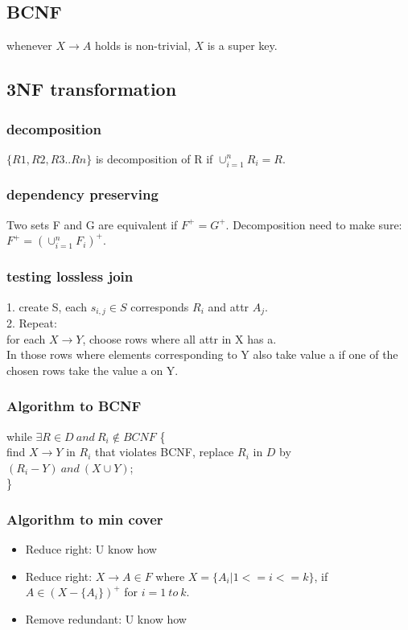 \documentclass[a4paper]{scrartcl}
\newcommand{\set}[2]{\{#1|#2\}}
\begin{document}
  \subsection{BCNF}
    whenever $X \rightarrow A$ holds is non-trivial, $X$ is a super key.
  \subsection{3NF transformation}
    \subsubsection{decomposition}
      $\{R1, R2, R3 .. Rn\}$ is decomposition of R if $\cup^{n}_{i=1}R_i = R$.
    \subsubsection{dependency preserving}
      Two sets F and G are equivalent if $F^+ = G^+$. Decomposition need to make sure: $F^+ = (\cup^n_{i=1}F_i)^+$.
    \subsubsection{testing lossless join}
      1. create S, each $s_{i,j} \in S$ corresponds $R_i$ and attr $A_j$.\\
      2. Repeat:\\
        for each $X \rightarrow Y$, choose rows where all attr in X has a.\\
        In those rows where elements corresponding to Y also take value a if one of the chosen rows take the value a on Y.
    \subsubsection{Algorithm to BCNF}
      while $\exists R \in D~and~R_i \notin BCNF$ \{\\
        find $X \rightarrow Y$ in $R_i$ that violates BCNF, replace $R_i$ in $D$ by $(R_i - Y)~and~(X \cup Y)$;\\
      \}
    \subsubsection{Algorithm to min cover}
      \begin{itemize}
        \item Reduce right: U know how
        \item Reduce right: $X \rightarrow A \in F$ where $X = \set{A_i}{1 <= i <= k}$, if $A \in (X - \{A_i\})^+$ for $i = 1~to~k$.
        \item Remove redundant: U know how
      \end{itemize}
\end{document}
